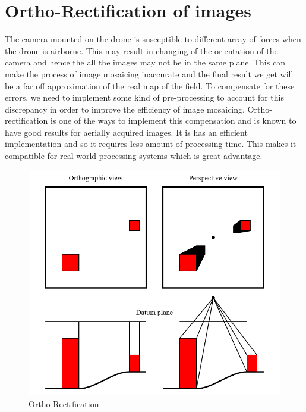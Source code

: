 \section{Ortho-Rectification of images}
The camera mounted on the drone is susceptible to different array of forces when the drone is airborne. This may result in changing of the orientation of the camera and hence the all the images may not be in the same plane. This can make the process of image mosaicing inaccurate and the final result we get will be a far off approximation of the real map of the field. To compensate for these errors, we need to implement some kind of pre-processing to account for this discrepancy in order to improve the efficiency of image mosaicing. Ortho-rectification is one of the ways to implement this compensation and is known to have good results for aerially acquired images. It is has an efficient implementation and so it requires less amount of processing time. This makes it compatible for real-world processing systems which is great advantage.
\begin{figure}[t]
	\includegraphics[height=0.9\linewidth]{extra-6}
	\centering
	\caption{\label{fig: extra-6}Ortho Rectification~\cite{OrthoPer57:online}}
\end{figure}
